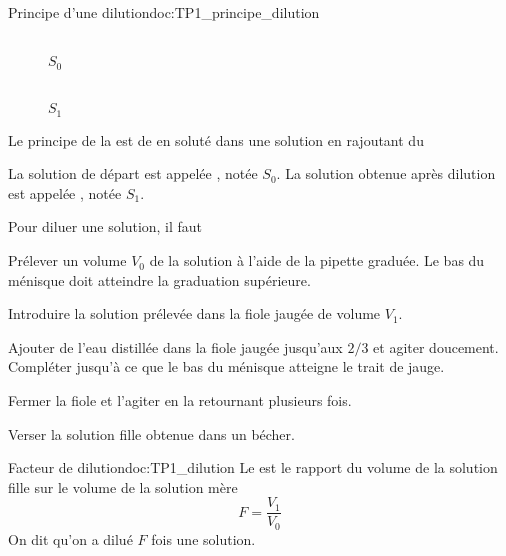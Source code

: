 \begin{doc}{Principe d'une dilution}{doc:TP1_principe_dilution}
  \begin{wrapfigure}[5]{r}{0.5\linewidth}
    \vspace*{-16pt}
    \centering
    \begin{multicols}{4}
     \\[0pt]
    \footnotesize{$S_0$}
    
    
    
     \\[0pt]
    \footnotesize{$S_1$}
    \end{multicols}
  \end{wrapfigure}
  \vAligne{-40pt}
  
  \begin{importants}
    Le principe de la  est de  en soluté dans une solution en rajoutant du 
  \end{importants}
  La solution de départ est appelée , notée $S_0$.
  La solution obtenue après dilution est appelée , notée $S_1$.

  Pour diluer une solution, il faut
  \begin{protocole}
    \item Prélever un volume $V_0$ de la solution à l'aide de la pipette graduée.
    Le bas du ménisque doit atteindre la graduation supérieure.
    \item Introduire la solution prélevée dans la fiole jaugée de volume $V_1$.
    \item Ajouter de l'eau distillée dans la fiole jaugée jusqu'aux $2/3$ et agiter doucement. Compléter jusqu'à ce que le bas du ménisque atteigne le trait de jauge.
    \item Fermer la fiole et l'agiter en la retournant plusieurs fois.
    \item Verser la solution fille obtenue dans un bécher.
  \end{protocole}
\end{doc}


\begin{doc}{Facteur de dilution}{doc:TP1_dilution}  
  Le  est le rapport du volume de la solution fille sur le volume de la solution mère
  \begin{equation*}
    F = \frac{V_\text{1}}{V_\text{0}}
  \end{equation*}
  On dit qu'on a dilué $F$ fois une solution.
\end{doc}

